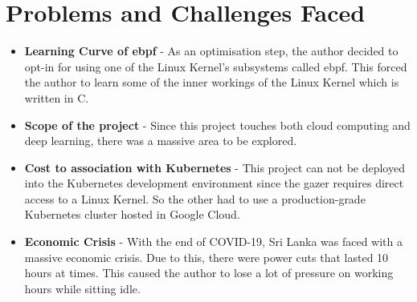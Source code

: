 \section{Problems and Challenges Faced}

\begin{itemize}[noitemsep,nolistsep]
    \item \textbf{Learning Curve of \ac{ebpf}} - As an optimisation step, the author decided to opt-in for using one of the Linux Kernel's subsystems called \ac{ebpf}. This forced the author to learn some of the inner workings of the Linux Kernel which is written in C.
    \item \textbf{Scope of the project} - Since this project touches both cloud computing and deep learning, there was a massive area to be explored.
    \item \textbf{Cost to association with Kubernetes} - This project can not be deployed into the Kubernetes development environment since the \ac{gazer} requires direct access to a Linux Kernel. So the other had to use a production-grade Kubernetes cluster hosted in Google Cloud.
    \item \textbf{Economic Crisis} - With the end of COVID-19, Sri Lanka was faced with a massive economic crisis. Due to this, there were power cuts that lasted 10 hours at times. This caused the author to lose a lot of pressure on working hours while sitting idle.
\end{itemize}